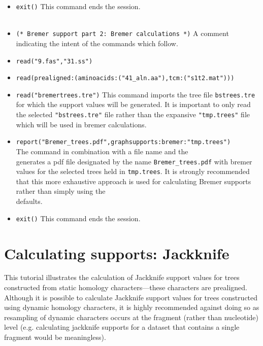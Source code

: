 \begin{itemize}
\item \texttt{exit()} This command ends the \poy session.
\\
\\
\item \texttt{(* Bremer support part 2: Bremer calculations *)}  A comment indicating the intent of the commands 
which follow.
\item \texttt{read("9.fas","31.ss")}
\item \texttt{read(prealigned:(aminoacids:("41\_aln.aa"),tcm:("s1t2.mat")))}
\item \texttt{read("bremertrees.tre")} This command imports the tree file \texttt{bstrees.tre} for which the support 
values will be generated.  It is important to only read the selected \texttt{"bstrees.tre"} file rather than the 
expansive \texttt{"tmp.trees"} file which will be used in bremer calculations.
\item \texttt{report("Bremer\_trees.pdf",graphsupports:bremer:"tmp.trees")} \\The {} command 
in combination with a file name and the \\  generates a pdf file designated by the 
name \texttt{Bremer\_trees.pdf} with bremer values for the selected trees held in \texttt{tmp.trees}.  It is strongly 
recommended that this more exhaustive approach is used for calculating Bremer supports rather than simply 
using the \\  defaults.  
\item \texttt{exit()} This command ends the \poy session.
\end{itemize}


\section{Calculating supports: Jackknife}{\label{tutorial5}}

This tutorial illustrates the calculation of Jackknife support values for trees constructed from static homology 
characters---these characters are prealigned.  Although it is possible to calculate Jackknife support values for trees constructed using 
dynamic homology characters, it is highly recommended against doing so as resampling of dynamic characters occurs 
at the fragment (rather than nucleotide) level (e.g. calculating jackknife supports for a dataset that contains a single fragment
would be meaningless). 

